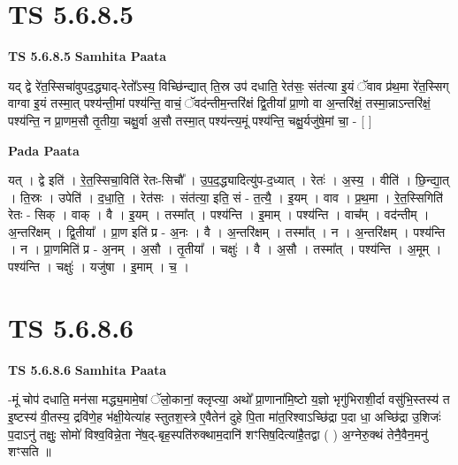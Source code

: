 \documentclass[17pt]{extarticle}
\begin{document}
\section*{ TS 5.6.8.5 }

\textbf{TS 5.6.8.5 } \newline
\textbf{Samhita Paata} \newline

यद् द्वे रे॑त॒स्सिचा॑वुपद॒द्ध्याद्-रेतो᳚ऽस्य॒ विच्छि॑न्द्यात् ति॒स्र उप॑ दधाति॒ रेत॑सः॒ संत॑त्या इ॒यं ॅवाव प्र॑थ॒मा रे॑त॒स्सिग् वाग्वा इ॒यं तस्मा॒त् पश्य॑न्ती॒मां पश्य॑न्ति॒ वाचं॒ ॅवद॑न्तीम॒न्तरि॑क्षं द्वि॒तीया᳚ प्रा॒णो वा अ॒न्तरि॑क्षं॒ तस्मा॒न्नाऽन्तरि॑क्षं॒ पश्य॑न्ति॒ न प्रा॒णम॒सौ तृ॒तीया॒ चक्षु॒र्वा अ॒सौ तस्मा॒त् पश्य॑न्त्य॒मूं पश्य॑न्ति॒ चक्षु॒र्यजु॑षे॒मां चा॒ - [  ] \newline

\textbf{Pada Paata} \newline

यत् । द्वे इति॑ । रे॒त॒स्सिचा॒विति॑ रेतः-सिचौ᳚ । उ॒प॒द॒द्ध्यादित्यु॑प-द॒ध्यात् । रेतः॑ । अ॒स्य॒ । वीति॑ । छि॒न्द्या॒त् । ति॒स्रः । उपेति॑ । द॒धा॒ति॒ । रेत॑सः । संत॑त्या॒ इति॒ सं - त॒त्यै॒ । इ॒यम् । वाव । प्र॒थ॒मा । रे॒त॒स्सिगिति॑ रेतः - सिक् । वाक् । वै । इ॒यम् । तस्मा᳚त् । पश्य॑न्ति । इ॒माम् । पश्य॑न्ति । वाच᳚म् । वद॑न्तीम् । अ॒न्तरि॑क्षम् । द्वि॒तीया᳚ । प्रा॒ण इति॑ प्र - अ॒नः । वै । अ॒न्तरि॑क्षम् । तस्मा᳚त् । न । अ॒न्तरि॑क्षम् । पश्य॑न्ति । न । प्रा॒णमिति॑ प्र - अ॒नम् । अ॒सौ । तृ॒तीया᳚ ।   चक्षुः॑ । वै । अ॒सौ । तस्मा᳚त् । पश्य॑न्ति । अ॒मूम् । पश्य॑न्ति । चक्षुः॑ । यजु॑षा । इ॒माम् । च॒ ।  \newline




\section*{ TS 5.6.8.6 }

\textbf{TS 5.6.8.6 } \newline
\textbf{Samhita Paata} \newline

-मूं चोप॑ दधाति॒ मन॑सा मद्ध्य॒मामे॒षां ॅलो॒कानां॒ क्लृप्त्या॒ अथो᳚ प्रा॒णाना॑मि॒ष्टो य॒ज्ञो भृगु॑भिराशी॒र्दा वसु॑भि॒स्तस्य॑ त इ॒ष्टस्य॑ वी॒तस्य॒ द्रवि॑णे॒ह भ॑क्षी॒येत्या॑ह स्तुतश॒स्त्रे ए॒वैतेन॑ दुहे पि॒ता मा॑त॒रिश्वाऽच्छि॑द्रा प॒दा धा॒ अच्छि॑द्रा उ॒शिजः॑ प॒दाऽनु॑ तक्षुः॒ सोमो॑ विश्व॒विन्ने॒ता ने॑ष॒द्-बृह॒स्पति॑रुक्थाम॒दानि॑ शꣳसिष॒दित्या॑है॒तद्वा ( ) अ॒ग्नेरु॒क्थं तेनै॒वैन॒मनु॑ शꣳसति ॥ \newline
\end{document}
